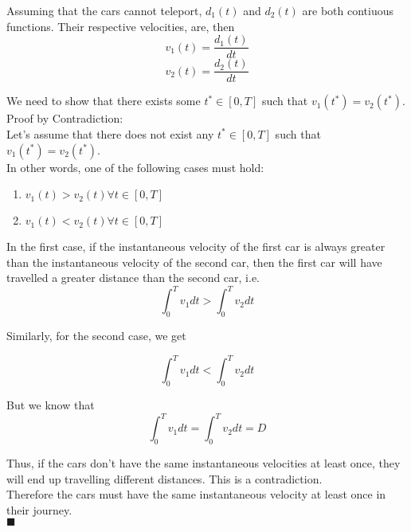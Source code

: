 \documentclass[a4paper,12pt]{article} %
\begin{document}
\begin{enumerate}
    Assuming that the cars cannot teleport, $d_1(t)$ and $d_2(t)$ are both contiuous functions. Their respective velocities, are, then
    $$ v_1(t) = \frac{d_1(t)}{dt} $$
    $$ v_2(t) = \frac{d_2(t)}{dt} $$

    We need to show that there exists some $t^{*} \in [0, T]$ such that $v_1(t^{*}) = v_2(t^{*})$.\\

    Proof by Contradiction:\\
    Let's assume that there does not exist any $t^{*} \in [0, T]$ such that $v_1(t^{*}) = v_2(t^{*})$.\\
    In other words, one of the following cases must hold:
    \begin{enumerate}
      \item $v_1(t) > v_2(t) \forall t \in [0, T]$
      \item $v_1(t) < v_2(t) \forall t \in [0, T]$
    \end{enumerate}

    In the first case, if the instantaneous velocity of the first car is always greater than the instantaneous velocity of the second car, then the first car will have travelled a greater distance than the second car, i.e.\\

    $$ \int_{0}^{T}v_{1}dt > \int_{0}^{T}v_{2}dt $$

    Similarly, for the second case, we get

    $$ \int_{0}^{T}v_{1}dt < \int_{0}^{T}v_{2}dt $$

    But we know that
    $$ \int_{0}^{T}v_{1}dt = \int_{0}^{T}v_{2}dt = D$$

    Thus, if the cars don't have the same instantaneous velocities at least once, they will end up travelling different distances. This is a contradiction.\\

    Therefore the cars must have the same instantaneous velocity at least once in their journey.\\
    $\blacksquare$

\end{enumerate}
\end{document}
